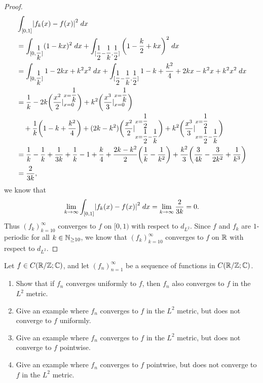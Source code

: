 \begin{proof}
\begin{align*}
     & \int_{[0, 1]} \abs{f_k(x) - f(x)}^2 \; dx                                                                                                                                                                                                    \\
     & = \int_{[0, \dfrac{1}{k}]} (1 - kx)^2 \; dx + \int_{[\dfrac{1}{2} - \dfrac{1}{k}, \dfrac{1}{2}]} \bigg(1 - \dfrac{k}{2} + kx\bigg)^2 \; dx                                                                                                   \\
     & = \int_{[0, \dfrac{1}{k}]} 1 - 2kx + k^2 x^2 \; dx + \int_{[\dfrac{1}{2} - \dfrac{1}{k}, \dfrac{1}{2}]} 1 - k + \dfrac{k^2}{4} + 2kx - k^2 x + k^2 x^2 \; dx                                                                                 \\
     & = \dfrac{1}{k} - 2k \bigg(\dfrac{x^2}{2}|_{x = 0}^{x = \dfrac{1}{k}}\bigg) + k^2 \bigg(\dfrac{x^3}{3}|_{x = 0}^{x = \dfrac{1}{k}}\bigg)                                                                                                      \\
     & \quad + \dfrac{1}{k} \bigg(1 - k + \dfrac{k^2}{4}\bigg) + (2k - k^2) \bigg(\dfrac{x^2}{2}|_{x = \dfrac{1}{2} - \dfrac{1}{k}}^{x = \dfrac{1}{2}}\bigg) + k^2 \bigg(\dfrac{x^3}{3}|_{x = \dfrac{1}{2} - \dfrac{1}{k}}^{x = \dfrac{1}{2}}\bigg) \\
     & = \dfrac{1}{k} - \dfrac{1}{k} + \dfrac{1}{3k} + \dfrac{1}{k} - 1 + \dfrac{k}{4} + \dfrac{2k - k^2}{2} \bigg(\dfrac{1}{k} - \dfrac{1}{k^2}\bigg) + \dfrac{k^2}{3} \bigg(\dfrac{3}{4k} - \dfrac{3}{2k^2} + \dfrac{1}{k^3}\bigg)                \\
     & = \dfrac{2}{3k},
  \end{align*}
  we know that
  \[
    \lim_{k \to \infty} \int_{[0, 1]} \abs{f_k(x) - f(x)}^2 \; dx = \lim_{k \to \infty} \dfrac{2}{3k} = 0.
  \]
  Thus \((f_k)_{k = 10}^\infty\) converges to \(f\) on \([0, 1)\) with respect to \(d_{L^2}\).
  Since \(f\) and \(f_k\) are \(1\)-periodic for all \(k \in \mathbb{N}_{\geq 10}\), we know that \((f_k)_{k = 10}^\infty\) converges to \(f\) on \(\mathbb{R}\) with respect to \(d_{L^2}\).
\end{proof}

\begin{ex}\label{ex:5.2.6}
  Let \(f \in C(\mathbb{R} / \mathbb{Z} ; \mathbb{C})\), and let \((f_n)_{n = 1}^\infty\) be a sequence of functions in \(C(\mathbb{R} / \mathbb{Z} ; \mathbb{C})\).
  \begin{enumerate}
    \item Show that if \(f_n\) converges uniformly to \(f\), then \(f_n\) also converges to \(f\) in the \(L^2\) metric.
    \item Give an example where \(f_n\) converges to \(f\) in the \(L^2\) metric, but does not converge to \(f\) uniformly.
    \item Give an example where \(f_n\) converges to \(f\) in the \(L^2\) metric, but does not converge to \(f\) pointwise.
    \item Give an example where \(f_n\) converges to \(f\) pointwise, but does not converge to \(f\) in the \(L^2\) metric.
  \end{enumerate}
\end{ex}

